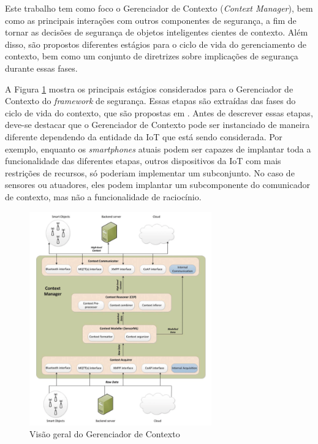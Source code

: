\documentclass[tid,table]{texufpel} %
\begin{document}
Este trabalho tem como foco o Gerenciador de Contexto (\textit{Context Manager}), bem como as principais interações com outros componentes de segurança, a fim de tornar as decisões de segurança de objetos inteligentes cientes de contexto. Além disso, são propostos diferentes estágios para o ciclo de vida do gerenciamento de contexto, bem como um conjunto de diretrizes sobre implicações de segurança durante essas fases.

A Figura \ref{context-manager-overview} mostra os principais estágios considerados para o Gerenciador de Contexto do \textit{framework} de segurança. Essas etapas são extraídas das fases do ciclo de vida do contexto, que são propostas em \cite{perera14}. Antes de descrever essas etapas, deve-se destacar que o Gerenciador de Contexto pode ser instanciado de maneira diferente dependendo da entidade da IoT que está sendo considerada. Por exemplo, enquanto os \textit{smartphones} atuais podem ser capazes de implantar toda a funcionalidade das diferentes etapas, outros dispositivos da IoT com mais restrições de recursos, só poderiam implementar um subconjunto. No caso de sensores ou atuadores, eles podem implantar um subcomponente do comunicador de contexto, mas não a funcionalidade de raciocínio.
 
 \begin{figure}[ht]
\centering
\includegraphics[width=0.7\textwidth]{imagens/context-manager-overview.png}
\caption{Visão geral do Gerenciador de Contexto}
\label{context-manager-overview}
\end{figure}
\end{document}
